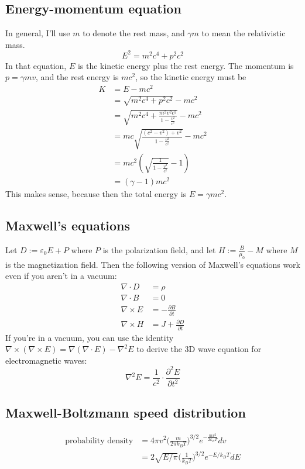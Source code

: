 \documentclass[12pt]{article}
\begin{document}
\subsection{Energy-momentum equation}
In general, I'll use $m$ to denote the rest mass, and $\gamma m$ to mean the relativistic mass.
\[E^2 = m^2 c^4 + p^2 c^2\]
In that equation, $E$ is the kinetic energy plus the rest energy. The momentum is $p = \gamma m v$, and the rest energy is $mc^2$, so the kinetic energy must be
\begin{align*}
    K &= E - mc^2 \\
      &= \sqrt{m^2 c^4 + p^2 c^2} - mc^2 \\
      &= \sqrt{m^2 c^4 + \frac{m^2 v^2 c^2}{1 - \frac{v^2}{c^2}}} - mc^2 \\
      &= m c \sqrt{\frac{(c^2 - v^2) + v^2}{1 - \frac{v^2}{c^2}}} - mc^2 \\
      &= m c^2 \left( \sqrt{\frac{1}{1 - \frac{v^2}{c^2}}} - 1 \right) \\
      &= (\gamma - 1) m c^2
\end{align*}
This makes sense, because then the total energy is $E = \gamma m c^2$.

\subsection{Maxwell's equations}
Let $D := \varepsilon_0 E + P$ where $P$ is the polarization field, and let $H := \frac{B}{\mu_0} - M$ where $M$ is the magnetization field. Then the following version of Maxwell's equations work even if you aren't in a vacuum:
\begin{align*}
    \nabla \cdot D &= \rho \\
    \nabla \cdot B &= 0 \\
    \nabla \times E &= - \frac{\partial B}{\partial t} \\
    \nabla \times H &= J + \frac{\partial D}{\partial t}
\end{align*}
If you're in a vacuum, you can use the identity $\nabla \times (\nabla \times E) = \nabla (\nabla \cdot E) - \nabla^2 E$ to derive the 3D wave equation for electromagnetic waves:
\[ \nabla^2 E = \frac{1}{c^2} \cdot \frac{\partial^2 E}{\partial t^2} \]

\subsection{Maxwell-Boltzmann speed distribution}
\begin{align*}
    \text{probability density} &= 4 \pi v^2 \Big( \frac{m}{2 \pi k_B T} \Big)^{3/2} e^{-\frac{m v^2}{2 k_B T}} dv \\
                               &= 2 \sqrt{E/\pi} \Big( \frac{1}{k_B T} \Big)^{3/2} e^{-E / k_B T} dE
\end{align*}
\end{document}
